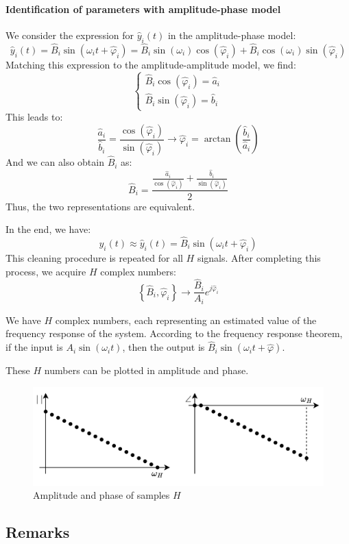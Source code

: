 \paragraph*{Identification of parameters with amplitude-phase model}
We consider the expression for $\hat{y}_i(t)$ in the amplitude-phase model:
\[\hat{y}_i(t)=\hat{B}_i\sin\left(\omega_i t+\hat{\varphi}_i\right)=\hat{B}_i\sin(\omega_i)\cos(\hat{\varphi}_i)+\hat{B}_i\cos(\omega_i)\sin(\hat{\varphi}_i)\]
Matching this expression to the amplitude-amplitude model, we find:
\[\begin{cases} \hat{B}_i\cos(\hat{\varphi}_i)=\hat{a}_i \\ \hat{B}_i\sin(\hat{\varphi}_i)=\hat{b}_i \end{cases}\]
This leads to:
\[\dfrac{\hat{a}_i}{\hat{b}_i}=\dfrac{\cos(\hat{\varphi}_i)}{\sin(\hat{\varphi}_i)}\rightarrow \hat{\varphi}_i=\arctan\left(\dfrac{\hat{b}_i}{\hat{a}_i}\right)\]
And we can also obtain $\hat{B}_i$ as:
\[\hat{B}_i=\dfrac{\frac{\hat{a}_i}{\cos(\hat{\varphi}_i)}+\frac{\hat{b}_i}{\sin(\hat{\varphi}_i)}}{2}\]
Thus, the two representations are equivalent.

In the end, we have:
\[y_i(t)\approx \hat{y}_i(t)=\hat{B}_i\sin(\omega_it+\hat{\varphi}_i)\]
This cleaning procedure is repeated for all $H$ signals.
After completing this process, we acquire $H$ complex numbers:
\[\left\{\hat{B}_i,\hat{\varphi}_i\right\}\rightarrow\dfrac{\hat{B}_i}{A_i}e^{j\hat{\varphi}_i}\]

We have $H$ complex numbers, each representing an estimated value of the frequency response of the system.
According to the frequency response theorem, if the input is $A_i\sin(\omega_it)$, then the output is $\hat{B}_i\sin\left(\omega_it+\hat{\varphi}\right)$. 

These $H$ numbers can be plotted in amplitude and phase. 
\begin{figure}[H]
    \centering
    \includegraphics[width=0.6\linewidth]{images/amp.png}
    \caption{Amplitude and phase of samples $H$}
\end{figure}

\subsection{Remarks}
